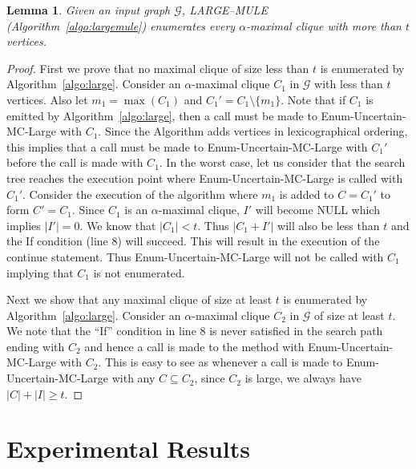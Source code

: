 \documentclass[11pt,letterpaper]{article}
\newtheorem{lemma}{Lemma}
\newcommand{\ugraph}{\mathcal{G}}
\begin{document}
\begin{lemma}
\label{lem:large}
Given an input graph $\ugraph$, LARGE--MULE (Algorithm~\ref{algo:largemule}) enumerates every $\alpha$-maximal clique with more than $t$ vertices.
\end{lemma}

\begin{proof}
First we prove that no maximal clique of size less than $t$ is enumerated by Algorithm~\ref{algo:large}. Consider an $\alpha$-maximal clique $C_1$ in $\ugraph$ with less than $t$ vertices. Also let $m_1 = \max(C_1)$ and $C_1' = C_1 \setminus \{ m_1 \}$.  Note that if $C_1$ is emitted by Algorithm~\ref{algo:large}, then a call must be made to Enum-Uncertain-MC-Large with $C_1$. Since the Algorithm adds vertices in lexicographical ordering, this implies that a call must be made to Enum-Uncertain-MC-Large with $C_1'$ before the call is made with $C_1$. In the worst case, let us consider that the search tree reaches the execution point where Enum-Uncertain-MC-Large is called with $C_1'$. Consider the execution of the algorithm where $m_1$ is added to $C = C_1'$ to form $C' = C_1$. Since $C_1$ is an $\alpha$-maximal clique, $I'$ will become NULL which implies $\left | I' \right | = 0$. We know that $\left | C_1 \right | < t$. Thus $\left | C_1 + I' \right |$ will also be less than $t$ and the If condition (line 8) will succeed. This will result in the execution of the continue statement. Thus Enum-Uncertain-MC-Large will not be called with $C_1$ implying that $C_1$ is not enumerated.

Next we show that any maximal clique of size at least $t$ is enumerated by Algorithm~\ref{algo:large}. Consider an $\alpha$-maximal clique $C_2$ in $\ugraph$ of size at least $t$. We note that the ``If'' condition in line 8 is never satisfied in the search path ending with $C_2$ and hence a call is made to the method with Enum-Uncertain-MC-Large with $C_2$. This is easy to see as whenever a call is made to Enum-Uncertain-MC-Large with any $C \subseteq C_2$, since $C_2$ is large, we always have $\left | C \right | + \left | I \right | \ge t$. 
\end{proof}

\section{Experimental Results}
\label{sec:expts}
\end{document}
